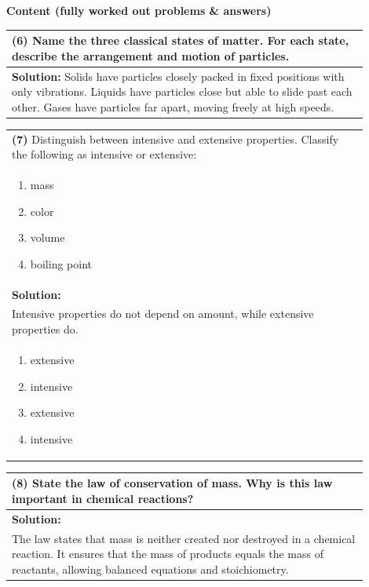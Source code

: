 \documentclass{article}
\begin{document}
\newpage
\noindent
{\large \textbf{Content (fully worked out problems \& answers)}} \\[0.2em]
\noindent
\begin{tabular}{|p{0.9\linewidth}|}
\hline
\vspace{0.2cm}

\textbf{(6)} Name the three classical states of matter. For each state, describe the arrangement and motion of particles. \\
\hline
\textbf{Solution:} Solids have particles closely packed in fixed positions with only vibrations. Liquids have particles close but able to slide past each other. Gases have particles far apart, moving freely at high speeds. \\
\hline
\end{tabular}
\newpage
\begin{tabular}{|p{0.9\linewidth}|}
\hline
\vspace{0.2cm}

\textbf{(7)} Distinguish between intensive and extensive properties. Classify the following as intensive or extensive: \\
\begin{enumerate}
    \item mass
    \item color
    \item volume
    \item boiling point
\end{enumerate}
\\
\hline
\textbf{Solution:} \\
Intensive properties do not depend on amount, while extensive properties do. \\
\begin{enumerate}
    \item extensive
    \item intensive
    \item extensive
    \item intensive
\end{enumerate}
\\
\hline
\end{tabular}
\newpage
\begin{tabular}{|p{0.9\linewidth}|}
\hline
\vspace{0.2cm}

\textbf{(8)} State the law of conservation of mass. Why is this law important in chemical reactions? \\
\hline
\textbf{Solution:} \\
The law states that mass is neither created nor destroyed in a chemical reaction. It ensures that the mass of products equals the mass of reactants, allowing balanced equations and stoichiometry. \\
\hline
\end{tabular}
\end{document}
